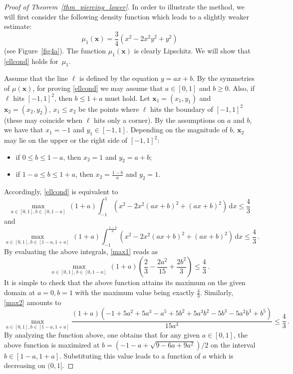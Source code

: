\documentclass[11pt,a4paper]{amsart}
\newcommand{\dd}{\,\mathrm{d}}
\newcommand{\x}{\mathbf{x}}
\begin{document}
\begin{proof}[Proof of Theorem~\ref{thm_piercing_lower}] In order to illustrate the method, we will first consider the following density function which leads to a slightly weaker estimate:
\begin{equation}\label{mu1}
{\mu_1}(\x) = \frac 3 4 ( x^2-2x^2y^2+y^2)
\end{equation}
(see Figure~\ref{fig4a}).
The function $\mu_1(\x)$ is clearly Lipschitz. We will show that \eqref{ellcond} holds for~$\mu_1$.

Assume that the line $\ell$ is defined by the equation $y = a x + b$.  By the symmetries of $\mu(\x)$, for proving \eqref{ellcond} we may assume that $a \in [0,1]$ and $b \geq 0$. Also, if $\ell$ hits $[-1,1]^2$, then $b \leq 1 + a $ must hold.
Let $\x_1 = (x_1, y_1)$ and $\x_2 = (x_2, y_2)$, $x_1 \leq x_2$ be the points where $\ell$ hits the boundary of $[-1,1]^2$ (these may coincide when $\ell$ hits only a corner). By the assumptions on $a$ and $b$, we have that $x_1 = -1$ and $y_1 \in [-1, 1]$. Depending on  the magnitude of $b$, $\x_2$ may lie on the upper or the right side of $[-1,1]^2$:
\begin{itemize}
\item if $0 \leq b \leq 1 - a$, then $x_2 = 1$ and $y_2 = a + b$;
\item if $1-a \leq b \leq 1 + a$, then $x_2 = \frac {1 -b}{a}$ and $y_2 = 1$.
\end{itemize}
Accordingly, \eqref{ellcond} is equivalent to
\begin{equation}\label{max1}
\max_{a \in [0,1], b \in [0, 1-a]} \, (1+a)\int_{-1}^1 (x^2 - 2 x^2 (a x + b)^2 + (a x + b)^2 ) \dd x \leq \frac 4 3
\end{equation}
and
\begin{equation}\label{max2}
\max_{a \in [0,1], b \in [1-a, 1+a]} \, (1+a)\int_{-1}^{\frac {1 -b}{a}} (x^2 - 2 x^2 (a x + b)^2 + (a x + b)^2 ) \dd x \leq \frac 4 3 \,.
\end{equation}
By evaluating the above integrals, \eqref{max1} reads as
\[
\max_{a \in [0,1], b \in [0, 1-a]} \, (1 + a) \left( \frac 2 3 - \frac{2 a^2}{15} + \frac{2 b^2}{3} \right) \leq \frac 4 3 \,.
\]
It is simple to check that the above function attains its maximum on the given domain at $a= 0, b=1$ with the maximum value being exactly $\frac 4 3$. Similarly, \eqref{max2} amounts to
\[
\max_{a \in [0,1], b \in [1-a, 1+a]} \frac {(1 + a)(-1 + 5 a^2 + 5 a^3 - a^5 + 5 b^2 + 5 a^3 b^2 - 5 b^3 -  5 a^2 b^3 + b^5)}{15 a^3} \leq \frac 4 3 \,.
\]
By analyzing the function above, one obtains that for any given $a \in [0,1]$, the above function is maximized at $b = (-1 - a + \sqrt{9 - 6 a + 9 a^2}) /2$ on the interval $b \in [1-a, 1+a]$. Substituting this value leads to a  function of $a$ which is decreasing on $(0,1]$.


\end{proof}
\end{document}
